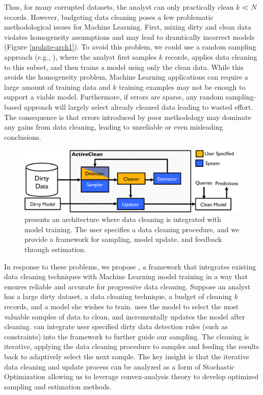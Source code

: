 Thus, for many corrupted datasets, the analyst can only practically clean $k \ll N$ records.
However, budgeting data cleaning poses a few problematic methodological issues for Machine Learning.
First, mixing dirty and clean data violates homogeneity assumptions and may lead to dramtically incorrect models (Figure \ref{update-arch1}).
To avoid this problem, we could use a random sampling approach (e.g., \cite{wang1999sample}), where the analyst first samples $k$ records, applies data cleaning to this subset, and then trains a model using only the clean data.
While this avoids the homogeneity problem, Machine Learning applications can require a large amount of training data and $k$ training examples may not be enough to support a viable model.
Furthermore, if errors are sparse, any random sampling-based approach will largely select already cleaned data leading to wasted effort.
The consequence is that errors introduced by poor methodology may dominate any gains from data cleaning, leading to unreliable or even misleading conclusions.

\begin{figure}[t]
\centering
 \includegraphics[width=\columnwidth]{figs/arch.png}
 \caption{\sysfull presents an architecture where data cleaning is integrated with model training. The user specifies a data cleaning procedure, and we provide a framework for sampling, model update, and feedback through estimation. \label{sys-arch}}\vspace{-2em}
\end{figure}

In response to these problems, we propose \sys, a framework that integrates existing data cleaning techniques with Machine Learning model training in a way that ensures reliable and accurate for progressive data cleaning.
Suppose an analyst has a large dirty dataset, a data cleaning technique, a budget of cleaning $k$ records, and a model she wishes to train.
\sys uses the model to select the most valuable samples of data to clean, and incrementally updates the model after cleaning.
\sys can integrate user specified dirty data detection rules (such as constraints) into the framework to further guide our sampling.
The cleaning is iterative, applying the data cleaning procedure to samples and feeding the results back to adaptively select the next sample. 
The key insight is that the iterative data cleaning and update process can be analyzed as a form of Stochastic Optimization \cite{bertsekas2011incremental} allowing us to leverage convex-analysis theory to develop optimized sampling and estimation methods.


